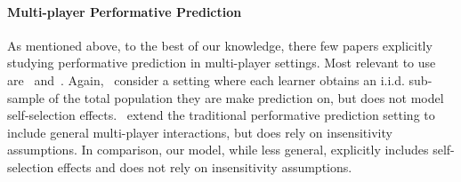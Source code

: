 \paragraph{Multi-player Performative Prediction} As mentioned above, to the best of our knowledge, there few papers explicitly studying performative prediction in multi-player settings. Most relevant to use are~\cite{dean2022multi} and~\cite{narang2023multiplayer}. Again,~\cite{dean2022multi} consider a setting where each learner obtains an i.i.d. sub-sample of the total population they are make prediction on, but does not model self-selection effects.~\cite{narang2023multiplayer} extend the traditional performative prediction setting to include general multi-player interactions, but does rely on insensitivity assumptions. In comparison, our model, while less general, explicitly includes self-selection effects and does not rely on insensitivity assumptions.

